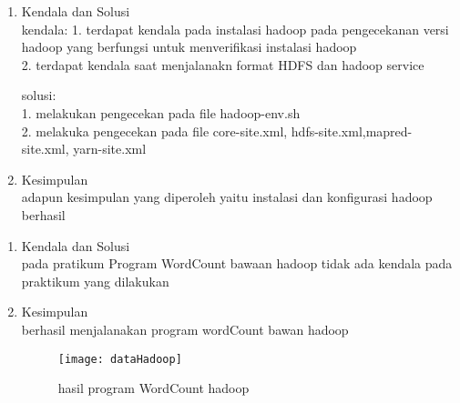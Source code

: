 

\begin{enumerate}
\item Kendala dan Solusi\\
kendala:
1. terdapat kendala pada instalasi hadoop pada pengecekanan versi hadoop yang berfungsi untuk menverifikasi instalasi hadoop\\
2. terdapat kendala saat menjalanakn format HDFS dan hadoop service

solusi:\\
1. melakukan pengecekan pada file hadoop-env.sh\\
2. melakuka  pengecekan pada file core-site.xml, hdfs-site.xml,mapred-site.xml, yarn-site.xml

\item Kesimpulan\\
adapun kesimpulan yang diperoleh yaitu instalasi dan konfigurasi hadoop berhasil 

\end{enumerate}

\begin{enumerate}
\item Kendala dan Solusi\\
pada pratikum Program WordCount bawaan hadoop tidak ada kendala pada praktikum yang dilakukan
\item Kesimpulan\\
berhasil menjalanakan program wordCount bawan hadoop
\newpage
\begin{figure}[!ht]
\texttt{[image: dataHadoop]}
\caption{hasil program WordCount hadoop}
\label{gam:Hasil}
\end{figure}

\end{enumerate}


